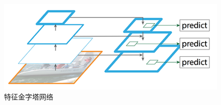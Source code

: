 \begin{figure}[h]
  \centering
  \includegraphics[width=0.75\linewidth]{Img/fpn.png}
  \caption{特征金字塔网络}
  \label{fig:fpn}
\end{figure}
